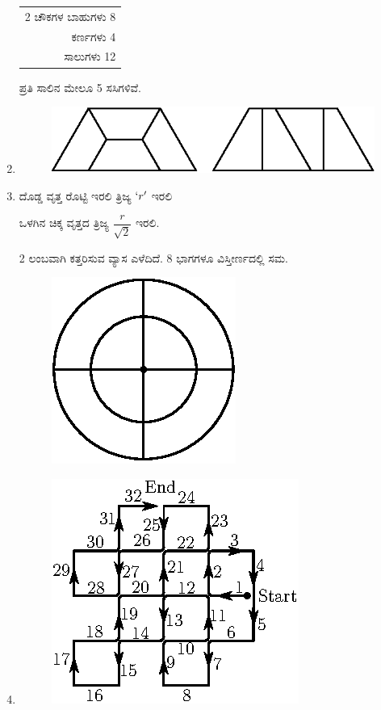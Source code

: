\begin{enumerate}
\begin{tabular}[t]{r}
2 ಚೌಕಗಳ ಬಾಹುಗಳು 8 \\
ಕರ್ಣಗಳು 4\\
\hline
ಸಾಲುಗಳು 12\\
\hline
\end{tabular}

ಪ್ರತಿ ಸಾಲಿನ ಮೇಲೂ 5 ಸಸಿಗಳಿವೆ. 

\item 
\begin{figure}[H]
\centering
\includegraphics{images/chap9/ans21.eps}
\end{figure}

\item ದೊಡ್ಡ ವೃತ್ತ ರೊಟ್ಟಿ ಇರಲಿ ತ್ರಿಜ್ಯ $`r'$ ಇರಲಿ 

ಒಳಗಿನ ಚಿಕ್ಕ ವೃತ್ತದ ತ್ರಿಜ್ಯ $\dfrac{r}{\sqrt{2}}$ ಇರಲಿ. 

2 ಲಂಬವಾಗಿ ಕತ್ತರಿಸುವ ವ್ಯಾಸ ಎಳೆದಿದೆ. 8 ಭಾಗಗಳೂ ವಿಸ್ತೀರ್ಣದಲ್ಲಿ ಸಮ. 
\begin{figure}[H]
\centering
\includegraphics{images/chap9/ans22.eps}
\end{figure}

\item 
\begin{figure}[H]
\centering
\includegraphics{images/chap9/ans23.eps}
\end{figure}


\end{enumerate}
